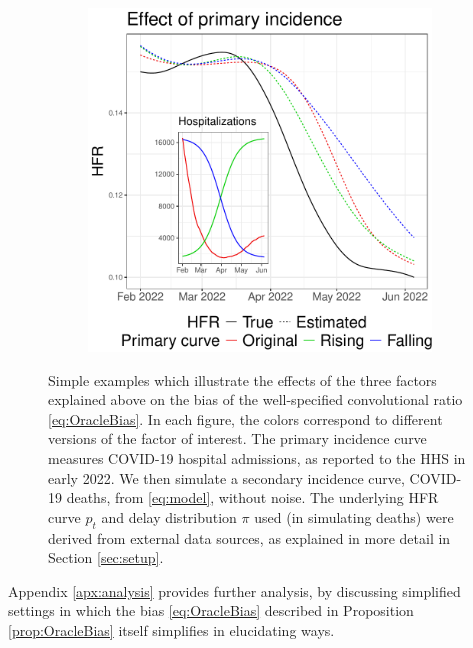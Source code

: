 \documentclass{article}
\begin{document}
\begin{figure}[htb]
\begin{subfigure}[b]{0.325\linewidth}
  \caption{}
  \label{fig:toy_delay}
\end{subfigure}
\begin{subfigure}[b]{0.325\linewidth}
  \centering
  \includegraphics[width=\linewidth]{Figures/Simulated/toy_chging_primary.pdf} 
  \caption{}
  \label{fig:toy_primary}
\end{subfigure}
\caption{Simple examples which illustrate the effects of the three factors
  explained above on 
  the bias of the well-specified convolutional ratio \eqref{eq:OracleBias}.
  In each figure, the colors correspond to different versions of the factor of interest.
  The primary incidence curve measures COVID-19 hospital admissions, as
  reported to the HHS in early 2022. We then simulate a secondary incidence
  curve, COVID-19 deaths, from \eqref{eq:model}, without noise. The underlying  
  HFR curve $p_t$ and delay distribution $\pi$ used (in simulating deaths) were 
  derived from external data sources, as explained in more detail in Section
  \ref{sec:setup}. }      
\label{fig:wellspecified}
\end{figure}
      
Appendix \ref{apx:analysis} provides further analysis, by discussing 
simplified settings in which the bias \eqref{eq:OracleBias} described in
Proposition \ref{prop:OracleBias} itself simplifies in elucidating ways.   
\end{document}
